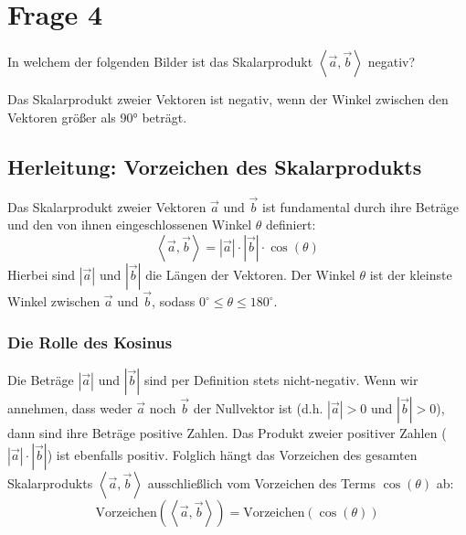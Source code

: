 \section{Frage 4}
In welchem der folgenden Bilder ist das Skalarprodukt $\left\langle \vec{a}, \vec{b} \right\rangle$ negativ?

Das Skalarprodukt zweier Vektoren ist negativ, wenn der Winkel zwischen den Vektoren größer als 90° beträgt.

\subsection*{Herleitung: Vorzeichen des Skalarprodukts}
Das Skalarprodukt zweier Vektoren $\vec{a}$ und $\vec{b}$ ist fundamental durch ihre Beträge und den von ihnen 
eingeschlossenen Winkel $\theta$ definiert:
$$ \left\langle \vec{a}, \vec{b} \right\rangle = |\vec{a}| \cdot |\vec{b}| \cdot \cos(\theta) $$
Hierbei sind $|\vec{a}|$ und $|\vec{b}|$ die Längen der Vektoren. Der Winkel $\theta$ ist der 
kleinste Winkel zwischen $\vec{a}$ und $\vec{b}$, sodass $0^\circ \le \theta \le 180^\circ$.

\subsubsection*{Die Rolle des Kosinus}
Die Beträge $|\vec{a}|$ und $|\vec{b}|$ sind per Definition stets nicht-negativ. Wenn wir annehmen, 
dass weder $\vec{a}$ noch $\vec{b}$ der Nullvektor ist (d.h. $|\vec{a}| > 0$ und $|\vec{b}| > 0$), dann 
sind ihre Beträge positive Zahlen.
Das Produkt zweier positiver Zahlen ($|\vec{a}| \cdot |\vec{b}|$) ist ebenfalls positiv.
Folglich hängt das Vorzeichen des gesamten Skalarprodukts $\left\langle \vec{a}, \vec{b} \right\rangle$ 
ausschließlich vom Vorzeichen des Terms $\cos(\theta)$ ab:
$$ \text{Vorzeichen}(\left\langle \vec{a}, \vec{b} \right\rangle) = \text{Vorzeichen}(\cos(\theta)) $$

